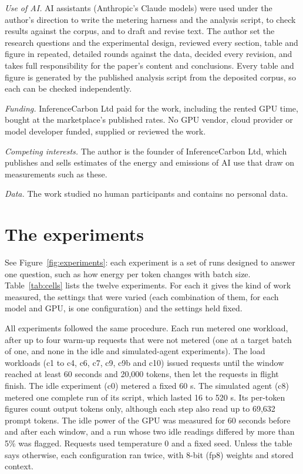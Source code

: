 \documentclass[11pt]{article}
\begin{document}
\noindent\emph{Use of AI.} AI assistants (Anthropic's Claude models) were used under the author's direction to write the metering harness and the analysis script, to check results against the corpus, and to draft and revise text. The author set the research questions and the experimental design, reviewed every section, table and figure in repeated, detailed rounds against the data, decided every revision, and takes full responsibility for the paper's content and conclusions. Every table and figure is generated by the published analysis script from the deposited corpus, so each can be checked independently.

\noindent\emph{Funding.} InferenceCarbon Ltd paid for the work, including the rented GPU time, bought at the marketplace's published rates. No GPU vendor, cloud provider or model developer funded, supplied or reviewed the work.

\noindent\emph{Competing interests.} The author is the founder of InferenceCarbon Ltd, which publishes and sells estimates of the energy and emissions of AI use that draw on measurements such as these.

\noindent\emph{Data.} The work studied no human participants and contains no personal data.




\appendix

\section{The experiments}\label{app:cells}

See Figure~\ref{fig:experiments}: each experiment is a set of runs designed to answer one question, such as how energy per token changes with batch size. Table~\ref{tab:cells} lists the twelve experiments. For each it gives the kind of work measured, the settings that were varied (each combination of them, for each model and GPU, is one configuration) and the settings held fixed.

All experiments followed the same procedure. Each run metered one workload, after up to four warm-up requests that were not metered (one at a target batch of one, and none in the idle and simulated-agent experiments). The load workloads (c1 to c4, c6, c7, c9, c9b and c10) issued requests until the window reached at least 60 seconds and 20,000 tokens, then let the requests in flight finish. The idle experiment (c0) metered a fixed 60 s. The simulated agent (c8) metered one complete run of its script, which lasted 16 to 520 s. Its per-token figures count output tokens only, although each step also read up to 69,632 prompt tokens. The idle power of the GPU was measured for 60 seconds before and after each window, and a run whose two idle readings differed by more than 5\% was flagged. Requests used temperature 0 and a fixed seed. Unless the table says otherwise, each configuration ran twice, with 8-bit (fp8) weights and stored context.
\end{document}
